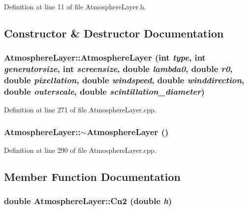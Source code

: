 Definition at line 11 of file AtmosphereLayer.h.



\subsection{Constructor \& Destructor Documentation}
\hypertarget{classAtmosphereLayer_a3c8790e634718a469133a50ec876bafe}{
\subsubsection[{AtmosphereLayer}]{\setlength{\rightskip}{0pt plus 5cm}AtmosphereLayer::AtmosphereLayer (int {\em type}, \/  int {\em generatorsize}, \/  int {\em screensize}, \/  double {\em lambda0}, \/  double {\em r0}, \/  double {\em pixellation}, \/  double {\em windspeed}, \/  double {\em winddirection}, \/  double {\em outerscale}, \/  double {\em scintillation\_\-diameter})}}
\label{classAtmosphereLayer_a3c8790e634718a469133a50ec876bafe}


Definition at line 271 of file AtmosphereLayer.cpp.

\hypertarget{classAtmosphereLayer_a871fc905e613df4efdffc2f631cab302}{
\subsubsection[{$\sim$AtmosphereLayer}]{\setlength{\rightskip}{0pt plus 5cm}AtmosphereLayer::$\sim$AtmosphereLayer ()}}
\label{classAtmosphereLayer_a871fc905e613df4efdffc2f631cab302}


Definition at line 290 of file AtmosphereLayer.cpp.



\subsection{Member Function Documentation}
\hypertarget{classAtmosphereLayer_a1359f46796c622d7e42d41958975a064}{
\subsubsection[{Cn2}]{\setlength{\rightskip}{0pt plus 5cm}double AtmosphereLayer::Cn2 (double {\em h})}}
\label{classAtmosphereLayer_a1359f46796c622d7e42d41958975a064}


